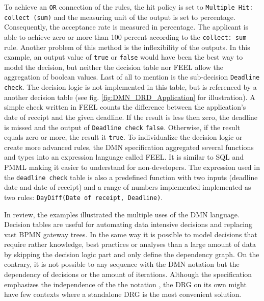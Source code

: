 To achieve an \texttt{OR} connection of the rules, the hit policy  is set to \texttt{Multiple Hit: collect (sum)} and the measuring unit of the output is set to percentage. Consequently, the acceptance rate is measured in percentage. The applicant is able to achieve zero or more than 100 percent according to the \texttt{collect: sum} rule. Another problem of this method is the inflexibility of the outputs. In this example, an output value of \texttt{true} or \texttt{false} would have been the best way to model the decision, but neither the decision table nor \ac{FEEL} allow the aggregation of boolean values. 
Last of all to mention is the sub-decision \texttt{Deadline check}. The decision logic is not implemented in this table, but is referenced by a another decision table (see fig. \ref{fig:DMN_DRD_Application} for illustration). A simple check written in \ac{FEEL} counts the difference between the application's date of receipt and the given deadline. If the result is less then zero, the deadline is missed and the output of \texttt{Deadline check} \texttt{false}. Otherwise, if the result equals zero or more, the result it \texttt{true}. 
To individualize the decision logic or create more advanced rules, the DMN specification aggregated several functions and types into an expression language called \acl{FEEL}. It is similar to \ac{SQL} and \ac{PMML} making it easier to understand for non-developers. The expression used in the \texttt{deadline check} table is also a predefined function with two inputs (deadline date and date of receipt) and a range of numbers implemented implemented as two rules: \texttt{DayDiff(Date of receipt, Deadline)}. 

In review, the examples illustrated the multiple uses of the DMN language. Decision tables are useful for automating data intensive decisions and replacing vast BPMN gateway trees. In the same way it is possible to model decisions that require rather knowledge, best practices or analyses than a large amount of data by skipping the decision logic part and only define the dependency graph. 
On the contrary, it is not possible to any sequence with the DMN notation but the dependency of decisions or the amount of iterations. Although the specification emphasizes the independence of the the notation \cite{DMNspec2016}, the \ac{DRG} on its own might have few contexts where a standalone \ac{DRG} is the most convenient solution. 

